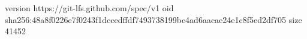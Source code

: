version https://git-lfs.github.com/spec/v1
oid sha256:48a8f0226e7f0243f1dccedffdf7493738199bc4ad6aacae24e1c8f5ed2df705
size 41452
